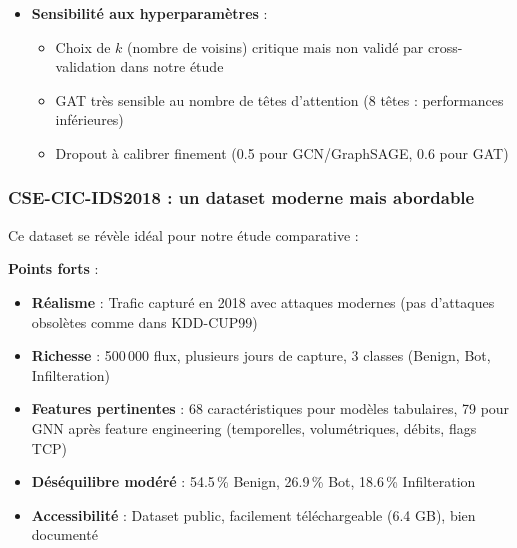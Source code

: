 ﻿\documentclass[11pt,a4paper]{article}
\begin{document}
\begin{itemize}
    \item \textbf{Sensibilité aux hyperparamètres} :
    \begin{itemize}
        \item Choix de $k$ (nombre de voisins) critique mais non validé par cross-validation dans notre étude
        \item GAT très sensible au nombre de têtes d'attention (8 têtes : performances inférieures)
        \item Dropout à calibrer finement (0.5 pour GCN/GraphSAGE, 0.6 pour GAT)
    \end{itemize}
\end{itemize}

\subsubsection{CSE-CIC-IDS2018 : un dataset moderne mais abordable}

Ce dataset se révèle idéal pour notre étude comparative :

\textbf{Points forts} :
\begin{itemize}
    \item \textbf{Réalisme} : Trafic capturé en 2018 avec attaques modernes (pas d'attaques obsolètes comme dans KDD-CUP99)
    \item \textbf{Richesse} : 500\,000 flux, plusieurs jours de capture, 3 classes (Benign, Bot, Infilteration)
    \item \textbf{Features pertinentes} : 68 caractéristiques pour modèles tabulaires, 79 pour GNN après feature engineering (temporelles, volumétriques, débits, flags TCP)
    \item \textbf{Déséquilibre modéré} : 54.5\,\% Benign, 26.9\,\% Bot, 18.6\,\% Infilteration
    \item \textbf{Accessibilité} : Dataset public, facilement téléchargeable (6.4 GB), bien documenté
\end{itemize}
\end{document}
